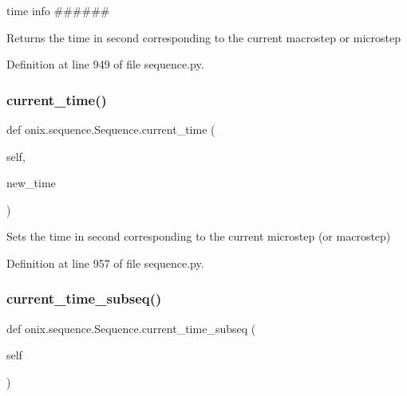 time info \#\#\#\#\#\# 

\begin{DoxyVerb}Returns the time in second corresponding to the current macrostep or microstep
\end{DoxyVerb}
 

Definition at line 949 of file sequence.\+py.

\mbox{\label{classonix_1_1sequence_1_1Sequence_a860aaaea529e3888b2a08f3b1543aa6f}} 
\subsubsection{\texorpdfstring{current\+\_\+time()}{current\_time()}\hspace{0.1cm}{\footnotesize\ttfamily [2/2]}}
{\footnotesize\ttfamily def onix.\+sequence.\+Sequence.\+current\+\_\+time (\begin{DoxyParamCaption}\item[{}]{self,  }\item[{}]{new\+\_\+time }\end{DoxyParamCaption})}

\begin{DoxyVerb}Sets the time in second corresponding to the current microstep (or macrostep)
\end{DoxyVerb}
 

Definition at line 957 of file sequence.\+py.

\mbox{\label{classonix_1_1sequence_1_1Sequence_a12a657e78bd3b21ab49b47ef81ef83a7}} 
\subsubsection{\texorpdfstring{current\+\_\+time\+\_\+subseq()}{current\_time\_subseq()}}
{\footnotesize\ttfamily def onix.\+sequence.\+Sequence.\+current\+\_\+time\+\_\+subseq (\begin{DoxyParamCaption}\item[{}]{self }\end{DoxyParamCaption})}

